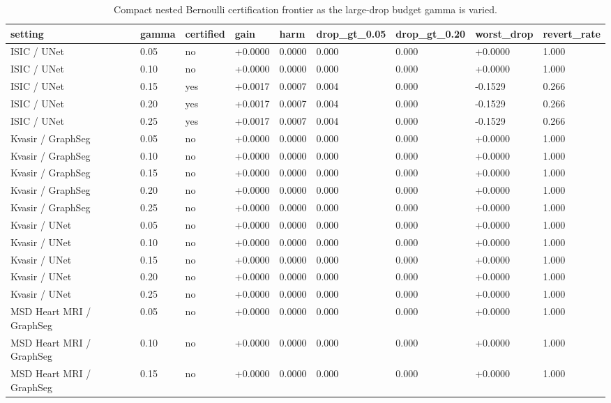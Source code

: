 \begin{table}[t]
\centering
\small
\caption{Compact nested Bernoulli certification frontier as the large-drop budget gamma is varied.}
\label{tab:nested_certification_frontier_compact}
\begin{tabular}{lllllllll}
\toprule
setting & gamma & certified & gain & harm & drop\_gt\_0.05 & drop\_gt\_0.20 & worst\_drop & revert\_rate \\
\midrule
ISIC / UNet & 0.05 & no & +0.0000 & 0.0000 & 0.000 & 0.000 & +0.0000 & 1.000 \\
ISIC / UNet & 0.10 & no & +0.0000 & 0.0000 & 0.000 & 0.000 & +0.0000 & 1.000 \\
ISIC / UNet & 0.15 & yes & +0.0017 & 0.0007 & 0.004 & 0.000 & -0.1529 & 0.266 \\
ISIC / UNet & 0.20 & yes & +0.0017 & 0.0007 & 0.004 & 0.000 & -0.1529 & 0.266 \\
ISIC / UNet & 0.25 & yes & +0.0017 & 0.0007 & 0.004 & 0.000 & -0.1529 & 0.266 \\
Kvasir / GraphSeg & 0.05 & no & +0.0000 & 0.0000 & 0.000 & 0.000 & +0.0000 & 1.000 \\
Kvasir / GraphSeg & 0.10 & no & +0.0000 & 0.0000 & 0.000 & 0.000 & +0.0000 & 1.000 \\
Kvasir / GraphSeg & 0.15 & no & +0.0000 & 0.0000 & 0.000 & 0.000 & +0.0000 & 1.000 \\
Kvasir / GraphSeg & 0.20 & no & +0.0000 & 0.0000 & 0.000 & 0.000 & +0.0000 & 1.000 \\
Kvasir / GraphSeg & 0.25 & no & +0.0000 & 0.0000 & 0.000 & 0.000 & +0.0000 & 1.000 \\
Kvasir / UNet & 0.05 & no & +0.0000 & 0.0000 & 0.000 & 0.000 & +0.0000 & 1.000 \\
Kvasir / UNet & 0.10 & no & +0.0000 & 0.0000 & 0.000 & 0.000 & +0.0000 & 1.000 \\
Kvasir / UNet & 0.15 & no & +0.0000 & 0.0000 & 0.000 & 0.000 & +0.0000 & 1.000 \\
Kvasir / UNet & 0.20 & no & +0.0000 & 0.0000 & 0.000 & 0.000 & +0.0000 & 1.000 \\
Kvasir / UNet & 0.25 & no & +0.0000 & 0.0000 & 0.000 & 0.000 & +0.0000 & 1.000 \\
MSD Heart MRI / GraphSeg & 0.05 & no & +0.0000 & 0.0000 & 0.000 & 0.000 & +0.0000 & 1.000 \\
MSD Heart MRI / GraphSeg & 0.10 & no & +0.0000 & 0.0000 & 0.000 & 0.000 & +0.0000 & 1.000 \\
MSD Heart MRI / GraphSeg & 0.15 & no & +0.0000 & 0.0000 & 0.000 & 0.000 & +0.0000 & 1.000 \\

\end{tabular}
\end{table}
